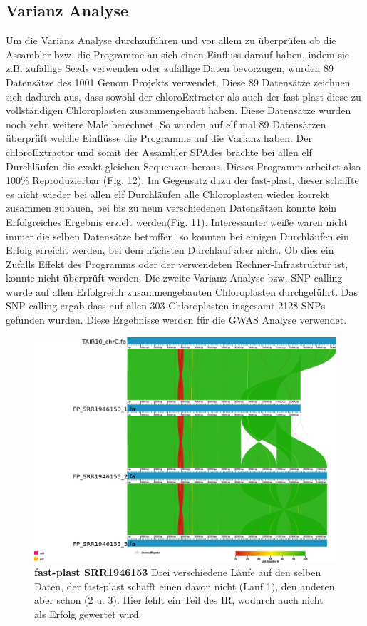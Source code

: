 \documentclass{scrartcl}
\begin{document}
\subsection{Varianz Analyse}
\label{sec-4-7}
Um die Varianz Analyse durchzuführen und vor allem zu überprüfen ob die Assambler bzw. die Programme an sich einen Einfluss darauf haben, indem sie z.B. zufällige Seeds verwenden oder zufällige Daten bevorzugen, wurden 89 Datensätze
des 1001 Genom Projekts verwendet. Diese 89 Datensätze zeichnen sich dadurch aus, dass sowohl der chloroExtractor als auch der fast-plast diese zu vollständigen Chloroplasten zusammengebaut haben. Diese Datensätze
wurden noch zehn weitere Male berechnet. So wurden auf elf mal 89 Datensätzen überprüft welche Einflüsse die Programme auf die Varianz haben. Der chloroExtractor und somit der Assambler SPAdes brachte bei allen elf
Durchläufen die exakt gleichen Sequenzen heraus. Dieses Programm arbeitet also 100\% Reproduzierbar (Fig. 12). Im Gegensatz dazu der fast-plast, dieser schaffte es nicht wieder bei allen elf Durchläufen alle Chloroplasten wieder
korrekt zusammen zubauen, bei bis zu neun verschiedenen Datensätzen konnte kein Erfolgreiches Ergebnis erzielt werden(Fig. 11). Interessanter weiße waren nicht immer die selben Datensätze betroffen, 
so konnten bei einigen Durchläufen
ein Erfolg erreicht werden, bei dem nächsten Durchlauf aber nicht. Ob dies ein Zufalls Effekt des Programms oder der verwendeten Rechner-Infrastruktur ist, konnte nicht überprüft werden.
Die zweite Varianz Analyse bzw. SNP calling wurde auf allen Erfolgreich zusammengebauten Chloroplasten durchgeführt. Das SNP calling ergab dass auf allen 303 Chloroplasten insgesamt 2128 SNPs gefunden wurden. 
Diese Ergebnisse werden für die GWAS Analyse verwendet.
\begin{figure}
\includegraphics[width=.9\linewidth]{./SRR1946153_FP_1.png}
\caption[fast-plast SRR1946153]{\textbf{fast-plast SRR1946153} Drei verschiedene Läufe auf den selben Daten, der fast-plast schafft einen davon nicht (Lauf 1), den anderen aber schon (2 u. 3). Hier fehlt ein Teil des IR, wodurch auch nicht als Erfolg gewertet wird. }
\end{figure}
\end{document}
